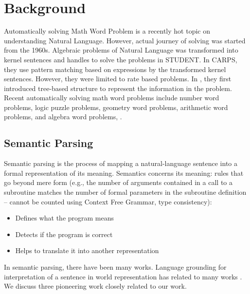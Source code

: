 \documentclass[document.tex]{subfiles}
\begin{document}
\section{Background}
\noindent Automatically solving Math Word Problem is a recently hot topic on understanding Natural Language. However, actual journey of solving was started from the 1960s. Algebraic problems of Natural Language was transformed into kernel sentences and handles to solve the problems in STUDENT\cite{4}. In CARPS\cite{5}, they use pattern matching based on expressions by the transformed kernel sentences. However, they were limited to rate based problems. In \cite{6}, they first introduced tree-based structure to represent the information in the problem. Recent automatically solving math word problems include number word problems\cite{7}, logic puzzle problems\cite{8}, geometry word problems\cite{9,10}, arithmetic word problems\cite{1}, \cite{11} and algebra word problems\cite{2,3}, \cite{12}.


\subsection{Semantic Parsing}
\noindent Semantic parsing is the process of mapping a natural-language sentence into a formal representation of its meaning. Semantics concerns its meaning: rules that go beyond mere
form (e.g., the number of arguments contained in a call to a
subroutine matches the number of formal parameters in the
subroutine definition – cannot be counted using Context Free Grammar, type
consistency):
\begin{itemize}
	\item Defines what the program means
	\item Detects if the program is correct
	\item Helps to translate it into another representation
\end{itemize}
In semantic parsing, there have been many works. Language grounding for interpretation of a sentence in world representation has related to many works \cite{13, 14, 15, 16, 17, 18, 19, 20, 21, 22, 23}. We discuss three pioneering work closely related to our work.
\end{document}
